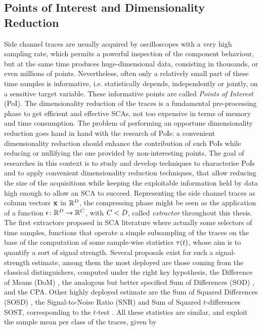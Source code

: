 \subsection{Points of Interest and Dimensionality Reduction}\label{sec:extractors}
Side channel traces are usually acquired by oscilloscopes with a very high sampling rate, which permits a powerful inspection of the component behaviour, but at the same time produces huge-dimensional data, consisting in thousands, or even millions of points. Nevertheless, often only a relatively small part of these time samples is informative, i.e. statistically depends, independently or jointly, on a sensitive target variable. These informative points are called \emph{Points of Interest} (PoI). The dimensionality reduction of the traces is a fundamental pre-processing phase to get efficient and effective SCAs, not too expensive in terms of memory and time consumption. The problem of performing an opportune dimensionality reduction goes hand in hand with the research of PoIs: a convenient dimensionality reduction should enhance the contribution of such PoIs while reducing or nullifying the one provided by non-interesting points. 
The goal of researches in this context is to study and develop techniques to characterise PoIs and to apply convenient dimensionality reduction techniques, that allow reducing the size of the acquisitions while keeping the exploitable information held by data high enough to allow an SCA to succeed.
Representing the side channel traces as column vectors ${\bf x}$ in $\mathbb{R}^D$, the compressing phase might be seen as the application of a function $\epsilon\colon \mathbb{R}^D\rightarrow \mathbb{R}^C$, with $C<D$, called {\em extractor} throughout this thesis. The first extractors proposed in SCA literature where actually some selectors of time samples, \ie functions that operate a simple subsampling of the traces on the base of the computation of some sample-wise statistics $\tau(t)$, whose aim is to quantify a sort of  signal strength. Several proposals exist for such a signal-strength estimate, among them the most deployed are those coming from the classical distinguishers, computed under the right key hypothesis, \eg the Difference of Means (DoM) \cite{Chari2003}, the analogous but better specified Sum of Differences (SOD) \cite{Rechberger2005}, and the CPA. Other highly deployed estimate are the Sum of Squared Differences (SOSD) \cite{gierlichs2006templates}, the Signal-to-Noise Ratio (SNR) \cite{mangard2008power,lomne2013behind} and  Sum of Squared $t$-differences SOST, corresponding to the $t$-test \cite{gierlichs2006templates}. All these statistics are similar, and exploit the sample mean per class of the traces, given by
